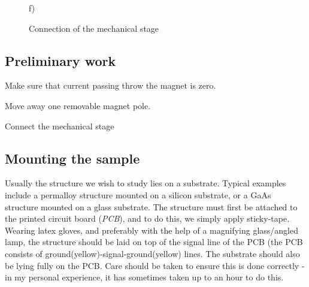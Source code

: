 \documentclass[14pt,a4paper] {article}
\begin{document}
\begin{figure}[pH]
\begin{minipage}[h]{0.5\linewidth}
 f)\\
\end{minipage}

\caption{Connection of the mechanical stage}
\label{fig:mStage}
\end{figure}


\subsection{Preliminary work}

Make sure that current passing throw the magnet is zero.

Move away one removable magnet pole.

Connect the mechanical stage 

\subsection{Mounting the sample}

Usually the structure we wish to study lies on a substrate. Typical examples include a permalloy structure mounted on a silicon substrate, or a GaAs structure mounted on a glass substrate. The structure must first be attached to the printed circuit board ({\it PCB}), and to do this, we simply apply sticky-tape. Wearing latex gloves, and preferably with the help of a magnifying glass/angled lamp, the structure should be laid on top of the signal line of the PCB (the PCB consists of ground(yellow)-signal-ground(yellow) lines. The substrate should also be lying fully on the PCB. Care should be taken to ensure this is done correctly - in my personal experience, it has sometimes taken up to an hour to do this.
\\
\end{document}
